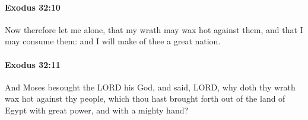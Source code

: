 		\paragraph{Exodus 32:10} %
			\label{EXODUS-32-10}

			Now therefore let me alone, that my wrath may wax hot against them, and that I may consume them: and I will make of thee a great nation.


		\paragraph{Exodus 32:11} %
			\label{EXODUS-32-11}

			And Moses besought the LORD his God, and said, LORD, why doth thy wrath wax hot against thy people, which thou hast brought forth out of the land of Egypt with great power, and with a mighty hand?


